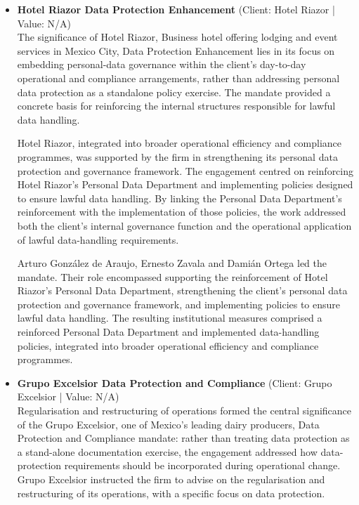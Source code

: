\documentclass[11pt]{article}
\begin{document}
\begin{itemize}
The work was expressly directed toward ensuring compliance with Mexican regulations while protecting sensitive data and trade secrets. The establishment of the Personal Data Protection Department is the concrete institutional outcome recorded for Biocodex: it provided a dedicated internal function connected to the structured personal data protection framework and to the handling of sensitive data and trade secrets under Mexican regulatory requirements.
\item \textbf{Hotel Riazor Data Protection Enhancement} (Client: Hotel Riazor | Value: N/A)\\ The significance of Hotel Riazor, Business hotel offering lodging and event services in Mexico City, Data Protection Enhancement lies in its focus on embedding personal-data governance within the client’s day-to-day operational and compliance arrangements, rather than addressing personal data protection as a standalone policy exercise. The mandate provided a concrete basis for reinforcing the internal structures responsible for lawful data handling.

Hotel Riazor, integrated into broader operational efficiency and compliance programmes, was supported by the firm in strengthening its personal data protection and governance framework. The engagement centred on reinforcing Hotel Riazor’s Personal Data Department and implementing policies designed to ensure lawful data handling. By linking the Personal Data Department’s reinforcement with the implementation of those policies, the work addressed both the client’s internal governance function and the operational application of lawful data-handling requirements.

Arturo González de Araujo, Ernesto Zavala and Damián Ortega led the mandate. Their role encompassed supporting the reinforcement of Hotel Riazor’s Personal Data Department, strengthening the client’s personal data protection and governance framework, and implementing policies to ensure lawful data handling. The resulting institutional measures comprised a reinforced Personal Data Department and implemented data-handling policies, integrated into broader operational efficiency and compliance programmes.
\item \textbf{Grupo Excelsior Data Protection and Compliance} (Client: Grupo Excelsior | Value: N/A)\\ Regularisation and restructuring of operations formed the central significance of the Grupo Excelsior, one of Mexico’s leading dairy producers, Data Protection and Compliance mandate: rather than treating data protection as a stand-alone documentation exercise, the engagement addressed how data-protection requirements should be incorporated during operational change. Grupo Excelsior instructed the firm to advise on the regularisation and restructuring of its operations, with a specific focus on data protection.


\end{itemize}
\end{document}

